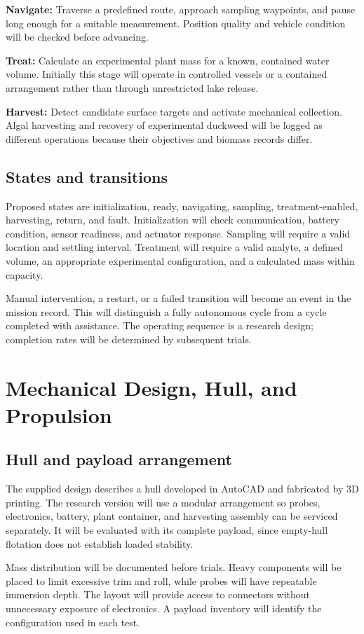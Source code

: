 \documentclass[12pt,a4paper]{article}
\newcommand{\papersection}[1]{\clearpage\section{#1}}
\begin{document}
\textbf{Navigate:} Traverse a predefined route, approach sampling waypoints, and pause long enough for a suitable measurement. Position quality and vehicle condition will be checked before advancing.

\textbf{Treat:} Calculate an experimental plant mass for a known, contained water volume. Initially this stage will operate in controlled vessels or a contained arrangement rather than through unrestricted lake release.

\textbf{Harvest:} Detect candidate surface targets and activate mechanical collection. Algal harvesting and recovery of experimental duckweed will be logged as different operations because their objectives and biomass records differ.

\subsection{States and transitions}
Proposed states are initialization, ready, navigating, sampling, treatment-enabled, harvesting, return, and fault. Initialization will check communication, battery condition, sensor readiness, and actuator response. Sampling will require a valid location and settling interval. Treatment will require a valid analyte, a defined volume, an appropriate experimental configuration, and a calculated mass within capacity.

Manual intervention, a restart, or a failed transition will become an event in the mission record. This will distinguish a fully autonomous cycle from a cycle completed with assistance. The operating sequence is a research design; completion rates will be determined by subsequent trials.

\papersection{Mechanical Design, Hull, and Propulsion}
\subsection{Hull and payload arrangement}
The supplied design describes a hull developed in AutoCAD and fabricated by 3D printing. The research version will use a modular arrangement so probes, electronics, battery, plant container, and harvesting assembly can be serviced separately. It will be evaluated with its complete payload, since empty-hull flotation does not establish loaded stability.

Mass distribution will be documented before trials. Heavy components will be placed to limit excessive trim and roll, while probes will have repeatable immersion depth. The layout will provide access to connectors without unnecessary exposure of electronics. A payload inventory will identify the configuration used in each test.
\end{document}
